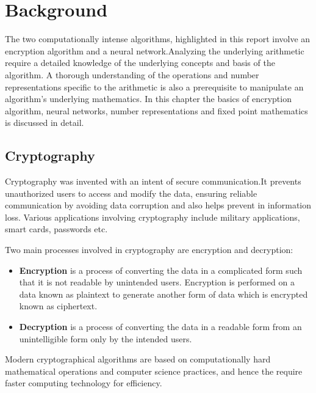 \chapter{Background}
\label{Chapter2}
The two computationally intense algorithms, highlighted in this report involve an encryption algorithm and a neural network.Analyzing the underlying arithmetic require a detailed knowledge of the underlying concepts and basis of the algorithm. A thorough understanding of the operations and number representations specific to the arithmetic is also a prerequisite to manipulate an algorithm's underlying mathematics. In this chapter the basics of encryption algorithm, neural networks, number representations and fixed point mathematics is discussed in detail.
\section{Cryptography}
Cryptography was invented with an intent of secure communication.It prevents unauthorized users to access and modify the data, ensuring reliable communication by avoiding data corruption and also helps prevent in information loss. Various applications involving cryptography include military applications, smart cards, passwords etc.

\noindent Two main processes involved in cryptography are encryption and decryption:
\vspace{0.25cm}
\begin{itemize}
\label{Encryption}
\item
\textbf{Encryption} is a process of converting the data in a complicated form such that it is not readable by unintended users. Encryption is performed on a data known as plaintext to generate another form of data which is encrypted known as ciphertext.

\item
\label{Decryption}
\vspace{0.25cm}
\textbf{Decryption} is a process of converting the data in a readable form from an unintelligible form only by the intended users.
\end{itemize}

\noindent Modern cryptographical algorithms are based on computationally hard mathematical operations and computer science practices, and hence the require faster computing technology for efficiency.

